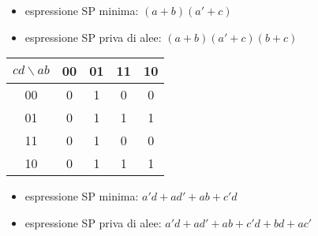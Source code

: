 \documentclass{subfiles}
\begin{document}
\begin{itemize}
    \item espressione SP minima: $(a+b)(a'+c)$
    \item espressione SP priva di alee: $(a+b)(a'+c)(b+c)$
\end{itemize}

\begin{center}
\begin{tabular}{ |c|c|c|c|c| }
\hline
$cd \backslash ab$ & 00 & 01 & 11 & 10 \\
\hline
\hline
00 & 0 & 1 & 0 & 0 \\
01 & 0 & 1 & 1 & 1 \\
11 & 0 & 1 & 0 & 0 \\
10 & 0 & 1 & 1 & 1 \\
\hline
\end{tabular}
\end{center}

\begin{itemize}
    \item espressione SP minima: $a'd + ad' + ab + c'd$
    \item espressione SP priva di alee: $a'd + ad' + ab + c'd + bd + ac'$
\end{itemize}
\end{document}
